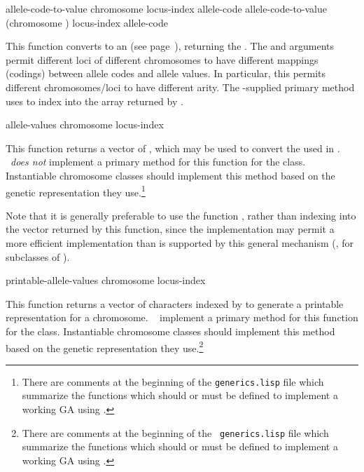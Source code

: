 {\filbreak
{\samepage
\Defgeneric allele-code-to-value {chromosome locus-index allele-code}
 allele-code-to-value {(chromosome ) locus-index allele-code}

This function converts  to an  (see
page~\pageref{allele-coding}), returning the .
The  and  arguments
permit different loci of different chromosomes to have different mappings (codings)
between allele codes and allele values. In particular, this permits different
chromosomes/loci to have different arity. The \geco-supplied primary method uses
 to index into the array returned by .
\par}%

\filbreak
{\samepage
\Defgeneric allele-values {chromosome locus-index}

This function returns a vector of , which may be used to convert the
 used in . \Geco\ {\em does not} implement a
primary method for this function for the  class. Instantiable chromosome
classes should implement this method based on the genetic representation they
use.\footnote{There are comments at the beginning of the {\tt generics.lisp} file which
summarize the functions which should or must be defined to implement a working GA using
\geco.}
\par}%

\filbreak
Note that it is generally preferable to use the function
, rather than indexing into the vector returned by
this function, since the implementation may permit a more efficient implementation
than is supported by this general mechanism (\eg, for subclasses of
).

\filbreak
{\samepage
\Defgeneric printable-allele-values {chromosome locus-index}

This function returns a vector of characters indexed by  to
generate a printable representation for a chromosome. \Geco\ 
implement a primary method for this function for the  class.
Instantiable chromosome classes should implement this method based on the genetic
representation they use.\footnote{There are comments at the beginning of the {\tt
generics.lisp} file which summarize the functions which should or must be defined to
implement a working GA using \geco.}
\par}%

}
